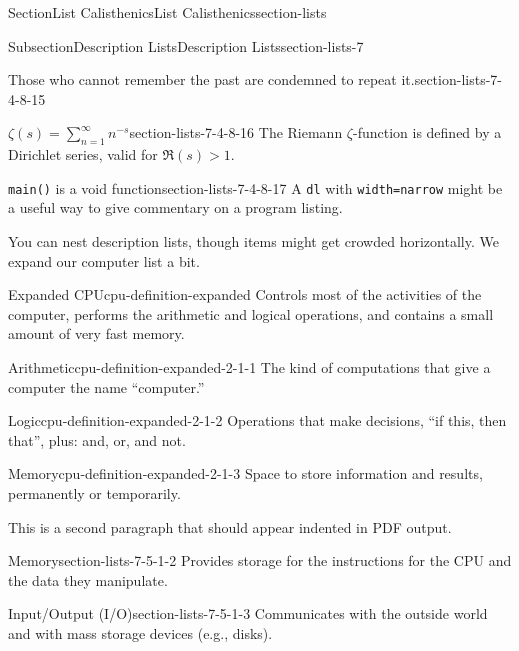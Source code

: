 \documentclass[twoside,10pt,]{article}
\newcommand{\mono}[1]{\texttt{#1}}
\numberwithin{equation}{section}
\begin{document}
\begin{sectionptx}{Section}{List Calisthenics}{}{List Calisthenics}{}{}{section-lists}
\begin{subsectionptx}{Subsection}{Description Lists}{}{Description Lists}{}{}{section-lists-7}
\begin{descriptionlist}
\begin{dlinarrow}{Those who cannot remember the past are condemned to repeat it.}{section-lists-7-4-8-15}
\end{dlinarrow}%
\begin{dlinarrow}{\(\displaystyle \zeta(s) = \sum_{n=1}^\infty n^{-s} \)}{section-lists-7-4-8-16}%
The Riemann \(\zeta\)-function is defined by a Dirichlet series, valid for \(\Re(s) > 1\).%
\end{dlinarrow}%
\begin{dlinarrow}{\mono{main()} is a void function}{section-lists-7-4-8-17}%
A \mono{dl} with \mono{width=\textquotedbl{}narrow\textquotedbl{}} might be a useful way to give commentary on a program listing.%
\end{dlinarrow}%
\end{descriptionlist}
%
\par
You can nest description lists, though items might get crowded horizontally.  We expand our computer list a bit.%
\begin{descriptionlist}
\begin{dlimedium}{Expanded CPU}{cpu-definition-expanded}%
Controls most of the activities of the computer, performs the arithmetic and logical operations, and contains a small amount of very fast memory.%
\begin{descriptionlist}
\begin{dlimedium}{Arithmetic}{cpu-definition-expanded-2-1-1}%
The kind of computations that give a computer the name ``computer.''%
\end{dlimedium}%
\begin{dlimedium}{Logic}{cpu-definition-expanded-2-1-2}%
Operations that make decisions, ``if this, then that'', plus: and, or, and not.%
\end{dlimedium}%
\begin{dlimedium}{Memory}{cpu-definition-expanded-2-1-3}%
Space to store information and results, permanently or temporarily.%
\end{dlimedium}%
\end{descriptionlist}
%
\par
This is a second paragraph that should appear indented in PDF output.%
\end{dlimedium}%
\begin{dlimedium}{Memory}{section-lists-7-5-1-2}%
Provides storage for the instructions for the CPU and the data they manipulate.%
\end{dlimedium}%
\begin{dlimedium}{Input\slash{}Output (I\slash{}O)}{section-lists-7-5-1-3}%
Communicates with the outside world and with mass storage devices (e.g.\@, disks).%
\end{dlimedium}%

\end{descriptionlist}
\end{subsectionptx}
\end{sectionptx}
\end{document}
